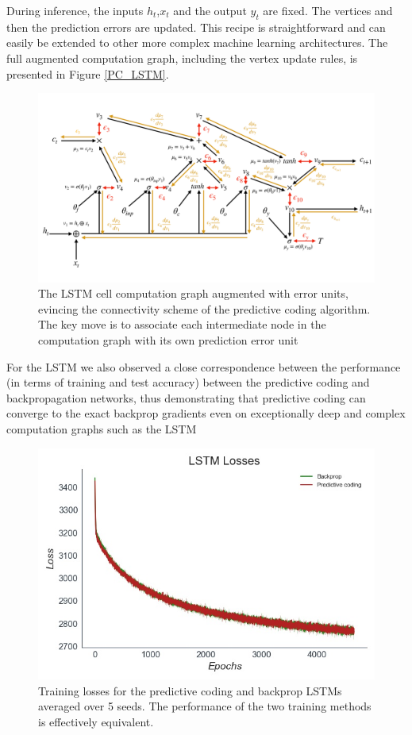 During inference, the inputs $h_t$,$x_t$ and the output $y_t$ are fixed. The vertices and then the prediction errors are updated. This recipe is straightforward and can easily be extended to other more complex machine learning architectures. The full augmented computation graph, including the vertex update rules, is presented in Figure \ref{PC_LSTM}.


\begin{figure}%
  \centering
  \includegraphics[width=1\linewidth]{chapter_6_figures/pc_LSTM.pdf}  
\caption{The LSTM cell computation graph augmented with error units, evincing the connectivity scheme of the predictive coding algorithm. The key move is to associate each intermediate node in the computation graph with its own prediction error unit}
\label{pc_lstm}
\end{figure}

For the LSTM we also observed a close correspondence between the performance (in terms of training and test accuracy) between the predictive coding and backpropagation networks, thus demonstrating that predictive coding can converge to the exact backprop gradients even on exceptionally deep and complex computation graphs such as the LSTM

\begin{figure}[ht]
  \centering
  \includegraphics[width=0.7\linewidth]{chapter_6_figures/LSTM_Losses_super_prelim_6.jpg}  
\caption{Training losses for the predictive coding and backprop LSTMs averaged over 5 seeds. The performance of the two training methods is effectively equivalent.}
\label{LSTM_losses}
\end{figure}

